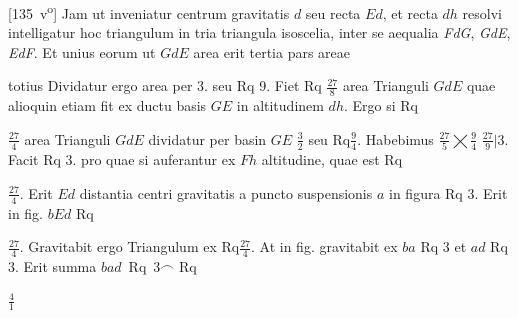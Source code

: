 [135~v\textsuperscript{o}]
\pend 
\newpage
\pstart
Jam ut inveniatur centrum gravitatis\protect{} $d$ seu recta $Ed$, et recta $dh$ resolvi intelligatur hoc triangulum in tria triangula  isoscelia, inter se aequalia \textit{FdG}, \textit{GdE}, \textit{EdF}. Et unius eorum ut $GdE$ area erit tertia pars areae \protect\rule[-4mm]{0mm}{10mm}totius 
 Dividatur ergo area per 3. seu Rq 9. Fiet  Rq $\displaystyle\frac{27}{8}$ area Trianguli $GdE$ quae alioquin etiam fit ex ductu basis  $GE$ in altitudinem $dh$. Ergo  si Rq \protect\rule[-4mm]{0mm}{10mm}$\displaystyle\frac{27}{4}$ area Trianguli $GdE$ dividatur per  basin $GE$ $\displaystyle\frac{3}{2}$ seu Rq$\displaystyle \frac{9}{4}$. Habebimus $\displaystyle\frac{27}{5}\bigtimes\frac{9}{4}$  $\displaystyle \frac{27}{9}\bigg \vert3$. Facit Rq 3. pro  quae si auferantur ex $Fh$ altitudine, quae est Rq \protect\rule[-4mm]{0mm}{10mm}$\displaystyle \frac{27}{4}$. Erit $Ed$ distantia centri gravitatis\protect{}  a puncto suspensionis $a$ in figura 
  Rq 3. Erit in fig.  $bEd$ Rq\protect\rule[-4mm]{0mm}{10mm}$\displaystyle\frac{27}{4}$. Gravitabit ergo Triangulum ex Rq$\displaystyle\frac{27}{4}$. 
\pend
\pstart
At in fig.  gravitabit  ex $ba$ Rq 3 et $ad$ Rq 3. Erit summa $bad$~Rq~$\displaystyle3\smallfrown$ Rq~\protect\rule[-4mm]{0mm}{10mm}$\displaystyle\frac{4}{1}$
